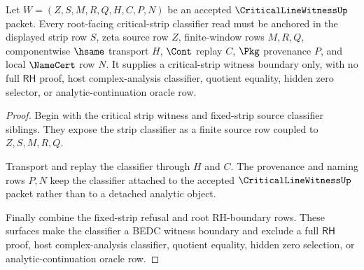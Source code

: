 \begin{theorem}
\label{thm:critical-line-witness-root-strip-classifier-obligation}
Let $W=(Z,S,M,R,Q,H,C,P,N)$ be an accepted $\CriticalLineWitnessUp$ packet. Every root-facing critical-strip classifier read must be anchored in the displayed strip row $S$, zeta source row $Z$, finite-window rows $M,R,Q$, componentwise $\hsame$ transport $H$, $\Cont$ replay $C$, $\Pkg$ provenance $P$, and local $\NameCert$ row $N$. It supplies a critical-strip witness boundary only, with no full $\mathsf{RH}$ proof, host complex-analysis classifier, quotient equality, hidden zero selector, or analytic-continuation oracle row.
\end{theorem}
\begin{proof}
Begin with the critical strip witness and fixed-strip source classifier siblings. They expose the strip classifier as a finite source row coupled to $Z,S,M,R,Q$.

Transport and replay the classifier through $H$ and $C$. The provenance and naming rows $P,N$ keep the classifier attached to the accepted $\CriticalLineWitnessUp$ packet rather than to a detached analytic object.

Finally combine the fixed-strip refusal and root RH-boundary rows. These surfaces make the classifier a BEDC witness boundary and exclude a full $\mathsf{RH}$ proof, host complex-analysis classifier, quotient equality, hidden zero selection, or analytic-continuation oracle row.
\end{proof}

